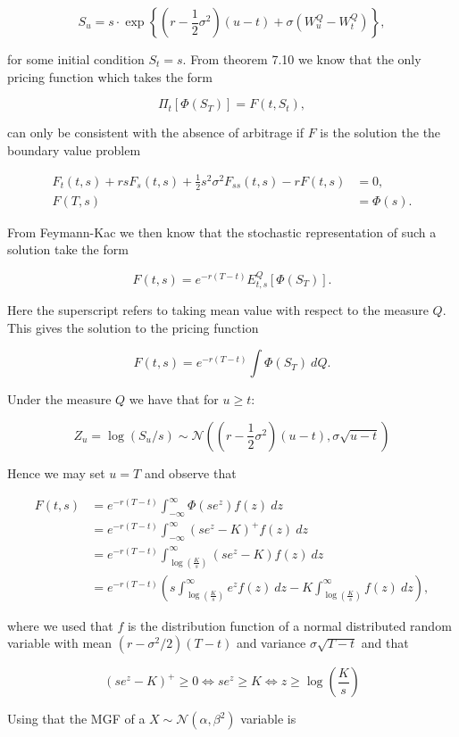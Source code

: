 \documentclass[
]{article}
\begin{document}
\[
S_u=s\cdot \exp\left\{\left(r-\frac{1}{2}\sigma^2\right)(u-t)+\sigma\left(W_u^Q-W_t^Q\right)\right\},
\]

for some initial condition \(S_t=s\). From theorem 7.10 we know that the
only pricing function which takes the form

\[
\Pi_t[\Phi(S_T)]=F(t,S_t),
\]

can only be consistent with the absence of arbitrage if \(F\) is the
solution the the boundary value problem

\begin{align*}
F_t(t,s)+rsF_s(t,s)+\frac{1}{2}s^2\sigma^2F_{ss}(t,s)-rF(t,s)&=0,\\
F(T,s)&=\Phi(s).
\end{align*}

From Feymann-Kac we then know that the stochastic representation of such
a solution take the form

\[
F(t,s)=e^{-r(T-t)}E_{t,s}^Q[\Phi(S_T)].
\]

Here the superscript refers to taking mean value with respect to the
measure \(Q\). This gives the solution to the pricing function

\[
F(t,s)=e^{-r(T-t)}\int \Phi(S_T)\ dQ.
\]

Under the measure \(Q\) we have that for \(u\ge t\):

\[
Z_u=\log (S_u/s)\sim \mathcal{N}\left(\left(r-\frac{1}{2}\sigma^2\right)(u-t),\sigma\sqrt{u-t}\right)
\]

Hence we may set \(u=T\) and observe that

\begin{align*}
F(t,s)&=e^{-r(T-t)}\int_{-\infty}^\infty \Phi(se^z) f(z)\ dz\\
&=e^{-r(T-t)}\int_{-\infty}^\infty (se^z-K)^+ f(z)\ dz\\
&=e^{-r(T-t)}\int_{\log\left(\frac{K}{s}\right)}^{\infty} (se^z-K) f(z)\ dz\\
&=e^{-r(T-t)}\left(s\int_{\log\left(\frac{K}{s}\right)}^{\infty} e^z f(z)\ dz-K\int_{\log\left(\frac{K}{s}\right)}^{\infty} f(z)\ dz\right),
\end{align*}

where we used that \(f\) is the distribution function of a normal
distributed random variable with mean \((r-\sigma^2/2)(T-t)\) and
variance \(\sigma\sqrt{T-t}\) and that

\[
(se^z-K)^+ \ge 0\iff se^z\ge K\iff z\ge \log\left(\frac{K}{s}\right)
\]

Using that the MGF of a \(X\sim\mathcal{N}(\alpha, \beta^2)\) variable
is
\end{document}
